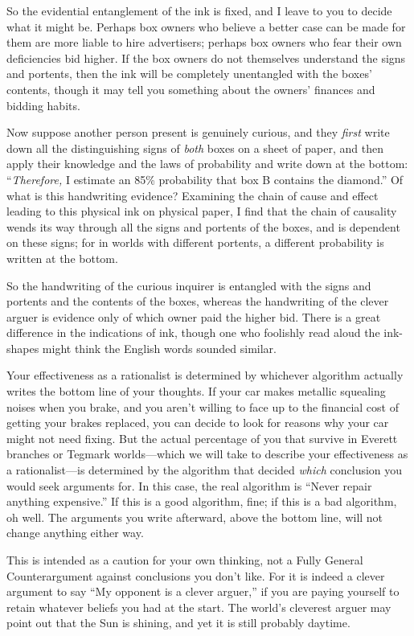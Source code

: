 {
 So the evidential entanglement of the ink is fixed, and I leave to
you to decide what it might be. Perhaps box owners who believe a better
case can be made for them are more liable to hire advertisers; perhaps
box owners who fear their own deficiencies bid higher. If the box
owners do not themselves understand the signs and portents, then the
ink will be completely unentangled with the boxes'
contents, though it may tell you something about the
owners' finances and bidding habits.}

{
 Now suppose another person present is genuinely curious, and they
\textit{first} write down all the distinguishing signs of \textit{both}
boxes on a sheet of paper, and then apply their knowledge and the laws
of probability and write down at the bottom:
``\textit{Therefore,} I estimate an 85\% probability
that box B contains the diamond.'' Of what is this
handwriting evidence? Examining the chain of cause and effect leading
to this physical ink on physical paper, I find that the chain of
causality wends its way through all the signs and portents of the
boxes, and is dependent on these signs; for in worlds with different
portents, a different probability is written at the bottom.}

{
 So the handwriting of the curious inquirer is entangled with the
signs and portents and the contents of the boxes, whereas the
handwriting of the clever arguer is evidence only of which owner paid
the higher bid. There is a great difference in the indications of ink,
though one who foolishly read aloud the ink-shapes might think the
English words sounded similar.}

{
 Your effectiveness as a rationalist is determined by whichever
algorithm actually writes the bottom line of your thoughts. If your car
makes metallic squealing noises when you brake, and you
aren't willing to face up to the financial cost of
getting your brakes replaced, you can decide to look for reasons why
your car might not need fixing. But the actual percentage of you that
survive in Everett branches or Tegmark worlds---which we will take to
describe your effectiveness as a rationalist---is determined by the
algorithm that decided \textit{which} conclusion you would seek
arguments for. In this case, the real algorithm is
``Never repair anything expensive.''
If this is a good algorithm, fine; if this is a bad algorithm, oh well.
The arguments you write afterward, above the bottom line, will not
change anything either way.}

{
 This is intended as a caution for your own thinking, not a Fully
General Counterargument against conclusions you don't
like. For it is indeed a clever argument to say ``My
opponent is a clever arguer,'' if you are paying
yourself to retain whatever beliefs you had at the start. The
world's cleverest arguer may point out that the Sun is
shining, and yet it is still probably daytime.}

